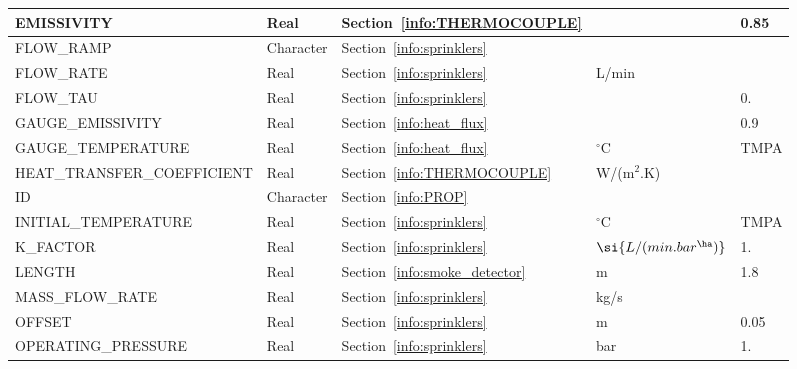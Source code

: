 \documentclass[11pt]{book}
\begin{document}
\begin{longtable}{@{\extracolsep{\fill}}|l|l|l|l|l|}
{\ct EMISSIVITY}                        & Real          & Section~\ref{info:THERMOCOUPLE}           &                       & 0.85      \\ \hline
{\ct FLOW\_RAMP}                        & Character     & Section~\ref{info:sprinklers}             &                       &           \\ \hline
{\ct FLOW\_RATE}                        & Real          & Section~\ref{info:sprinklers}             & L/min                 &           \\ \hline
{\ct FLOW\_TAU}                         & Real          & Section~\ref{info:sprinklers}             &                       & 0.       \\ \hline
{\ct GAUGE\_EMISSIVITY}                 & Real          & Section~\ref{info:heat_flux}              &                       & 0.9       \\ \hline
{\ct GAUGE\_TEMPERATURE}                & Real          & Section~\ref{info:heat_flux}              & $^\circ$C             & {\ct TMPA}\\ \hline
{\ct HEAT\_TRANSFER\_COEFFICIENT}       & Real          & Section~\ref{info:THERMOCOUPLE}           & \si{W/(m$^2$.K)}      &           \\ \hline
{\ct ID}                                & Character     & Section~\ref{info:PROP}                   &                       &           \\ \hline
{\ct INITIAL\_TEMPERATURE}              & Real          & Section~\ref{info:sprinklers}             & $^\circ$C             & {\ct TMPA}\\ \hline
{\ct K\_FACTOR}                         & Real          & Section~\ref{info:sprinklers}             & $\si{L/(min.bar^{\ha})}$ & 1.        \\ \hline
{\ct LENGTH}                            & Real          & Section~\ref{info:smoke_detector}         & m                     & 1.8       \\ \hline
{\ct MASS\_FLOW\_RATE}                  & Real          & Section~\ref{info:sprinklers}             & kg/s                  &           \\ \hline
{\ct OFFSET}                            & Real          & Section~\ref{info:sprinklers}             & m                     & 0.05      \\ \hline
{\ct OPERATING\_PRESSURE}               & Real          & Section~\ref{info:sprinklers}             & bar                   & 1.        \\ \hline

\end{longtable}
\end{document}

